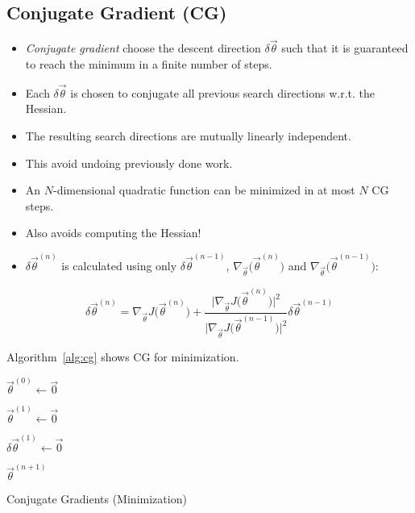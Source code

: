 		\subsection{Conjugate Gradient (CG)}
			\begin{itemize}
				\item \emph{Conjugate gradient} choose the descent direction \(\delta\vec{\theta}\) such that it is guaranteed to reach the minimum in a finite number of steps.
				\item Each \(\delta\vec{\theta}\) is chosen to conjugate all previous search directions w.r.t. the Hessian.
				\item The resulting search directions are mutually linearly independent.
				\item This avoid undoing previously done work.
				\item An \(N\)-dimensional quadratic function can be minimized in at most \(N\) CG steps.
				\item Also avoids computing the Hessian!
				\item \(\delta\vec{\theta}^{(n)}\) is calculated using only \( \delta\vec{\theta}^{(n - 1)} \), \( \nabla_{\vec{\theta}} \big(\vec{\theta}^{(n)}\big) \) and \( \nabla_{\vec{\theta}} \big(\vec{\theta}^{(n - 1)}\big) \):
			\end{itemize}
			\begin{equation}
				\delta\vec{\theta}^{(n)} = \nabla_{\vec{\theta}} J\big(\vec{\theta}^{(n)}\big) + \frac{\Big|\nabla_{\vec{\theta}} J\big(\vec{\theta}^{(n)}\big)\Big|^2}{\Big|\nabla_{\vec{\theta}} J\big(\vec{\theta}^{(n - 1)}\big)\Big|^2} \delta\vec{\theta}^{(n - 1)}
			\end{equation}

			Algorithm~\ref{alg:cg} shows CG for minimization.

			\begin{algorithm}
				\( \vec{\theta}^{(0)} \gets \vec{0} \)

				\( \vec{\theta}^{(1)} \gets \vec{0} \)

				\( \delta\vec{\theta}^{(1)} \gets \vec{0} \)


				\Return \(\vec{\theta}^{(n + 1)}\)

				\caption{Conjugate Gradients (Minimization)}
				\label{alg:cg}
			\end{algorithm}

